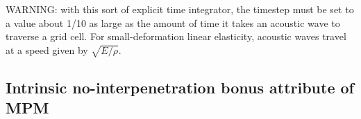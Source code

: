 WARNING: with this sort of explicit time integrator, the timestep must be set to a value about 1/10 as large as the amount of time it takes an acoustic wave to traverse a grid cell. For small-deformation linear elasticity, acoustic waves travel at a speed given by $\sqrt{E/\rho}$.

\subsection{Intrinsic no-interpenetration bonus attribute of MPM}
